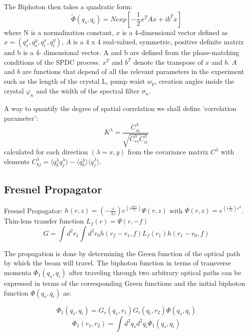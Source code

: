 The Biphoton then takes a quadratic form:
\begin{equation}\label{eq:quadratic}
\tilde{\Phi}(q_s,q_i)=N exp\left[ -\frac{1}{2}x^T A x + i b^T x \right]
\end{equation}
where N is a normalization constant, $x$ is a 4-dimensional vector defined as $x = (q^x_s, q^y_s ,q^x_i,q^y_i )$, $A$ is a 4 x 4 real-valued, symmetric, positive definite matrix and b is a 4- dimensional vector. A and b are defined from the phase-matching conditions of the SPDC process. $x^T$ and $b^T$ denote the transpose of $x$ and $b$. $A$ and $b$ are functions that depend of all the relevant parameters in the experiment such as the length of the crystal L, pump waist $w_p$, creation angles inside the crystal $\varphi_n$ and the width of the spectral filter $\sigma_n$.

A way to quantify the degree of spatial correlation we shall define 'correlation parameter':
\begin{equation}
K^\lambda = \frac{C^\lambda_{si}}{\sqrt{C^\lambda_{ss}C^\lambda_{ii}}}
\end{equation}
calculated for each direction $(\lambda = x, y)$ from the covariance matrix $C^\lambda$ with elements $C^\lambda_{kj} = \langle q^\lambda_k q^\lambda_j \rangle - \langle q^\lambda_k \rangle \langle q^\lambda_j \rangle $.


\subsection{Fresnel Propagator}
Fresnel Propagator: $h(r,z)=(- \frac{i}{\lambda z})e^{(i \frac{2 \pi z}{\lambda})} \Psi (r,z)$ 
with $\Psi(r,z) = e^{(i \frac{\pi}{\lambda z })r^2}$. Thin-lens transfer function $L_f (r)=\Psi(r,-f)$
 \\
\begin{equation}\label{eq:green}
G= \int d^2 r_1 \int d^2 r_0 h(r_f - r_1,f) L_f(r_1) h(r_1 - r_0,f)
\end{equation}

The propagation is done by determining the Green function of the optical path
by which the beam will travel. The biphoton function
in terms of transverse momenta $\Phi_1 (q_s , q_i )$ after traveling
through two arbitrary optical paths can be expressed
in terms of the corresponding Green functions and the
initial biphoton function $\Phi(q_s , q_i )$ as:

\begin{equation}
\Phi_1 (q_s , q_i )= G_s(q_s,r_1) G_i(q_i,r_2) \Phi (q_s,q_i) 
\end{equation}
\begin{equation}
\Phi_1 (r_1 , r_2 )= \int d^2 q_s d^2 q_i \Phi_1 (q_s , q_i ) 
\end{equation}

